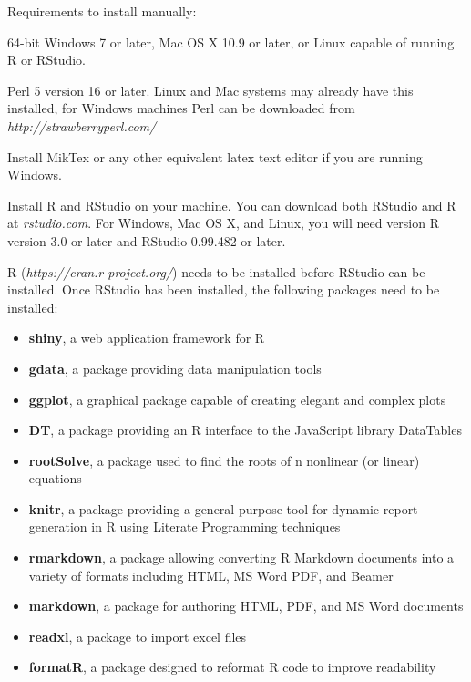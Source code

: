 \documentclass[conference]{IEEEtran}
\begin{document}
Requirements to install manually:
\begin{itemize}%
  \item {64-bit Windows 7 or later, Mac OS X 10.9 or later, or Linux capable of running R or RStudio.}
  \item {Perl 5 version 16 or later. Linux and Mac systems may already have this installed, for Windows machines Perl can be downloaded from \textit{http://strawberryperl.com/}}
  \item{Install MikTex or any other equivalent latex text editor if you are running Windows.}
  \item {Install R and RStudio on your machine. You can download both RStudio and R at \textit{rstudio.com}. For Windows, Mac OS X, and Linux, you will need version R version 3.0 or later and RStudio 0.99.482 or later.
  \item {R (\textit{https://cran.r-project.org/}) needs to be installed before RStudio can be installed. Once RStudio has been installed, the following packages need to be installed:
        \begin{itemize}
          \item {\textbf{shiny}, a web application framework for R}
          \item {\textbf{gdata}, a package providing data manipulation tools}
          \item {\textbf{ggplot}, a graphical package capable of creating elegant and complex plots}
          \item {\textbf{DT}, a package providing an R interface to the JavaScript library DataTables}
          \item {\textbf{rootSolve}, a package used to find the roots of n nonlinear (or linear) equations}
          \item {\textbf{knitr}, a package providing a general-purpose tool for dynamic report generation in R using Literate Programming techniques}
          \item {\textbf{rmarkdown}, a package allowing converting R Markdown documents into a variety of formats including HTML, MS Word PDF, and Beamer}
          \item {\textbf{markdown}, a package for authoring HTML, PDF, and MS Word documents}
          \item {\textbf{readxl}, a package to import excel files}
          \item {\textbf{formatR}, a package designed to reformat R code to improve readability}

\end{itemize}}}
\end{itemize}
\end{document}

